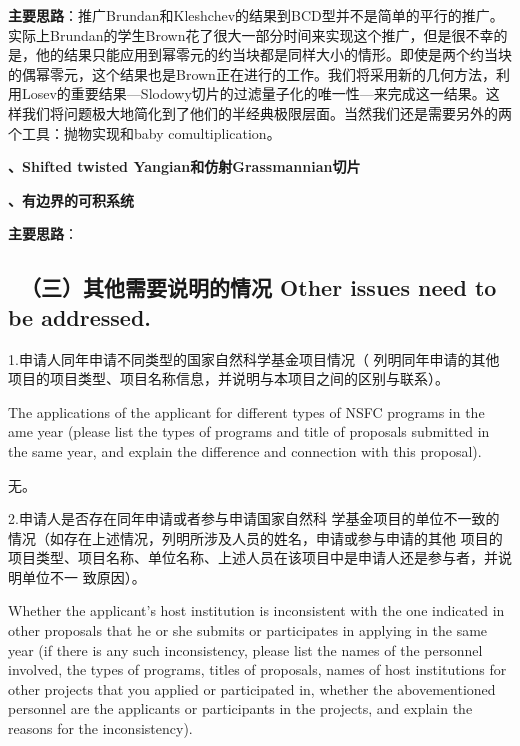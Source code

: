 \documentclass[12pt,UTF8,AutoFakeBold=4,a4paper]{ctexart}
\begin{document}
\textbf{主要思路}：推广Brundan和Kleshchev的结果到BCD型并不是简单的平行的推广。实际上Brundan的学生Brown花了很大一部分时间来实现这个推广，但是很不幸的是，他的结果只能应用到幂零元的约当块都是同样大小的情形。即使是两个约当块的偶幂零元，这个结果也是Brown正在进行的工作。我们将采用新的几何方法，利用Losev的重要结果---Slodowy切片的过滤量子化的唯一性---来完成这一结果。这样我们将问题极大地简化到了他们的半经典极限层面。当然我们还是需要另外的两个工具：抛物实现和baby comultiplication。

\medskip

\textbf{、Shifted twisted Yangian和仿射Grassmannian切片}

\medskip

\textbf{、有边界的可积系统}

\textbf{主要思路}：


{\color{MsBlue} \subsection{\sihao \kaishu \quad \ \bfseries（三）其他需要说明的情况 
\xiaosihao {} Other issues need to be addressed.}}
%

{\sihao \color{MsBlue} \kaishu 1.申请人同年申请不同类型的国家自然科学基金项目情况（
列明同年申请的其他项目的项目类型、项目名称信息，并说明与本项目之间的区别与联系）。}

{\color{MsBlue} \xiaosihao {} 
The applications of the applicant for different types of NSFC programs in the 
ame year (please list the types of programs and title of proposals submitted 
in the same year, and explain the difference and connection with this proposal).}

无。

{\sihao \color{MsBlue} \kaishu 2.申请人是否存在同年申请或者参与申请国家自然科
学基金项目的单位不一致的情况（如存在上述情况，列明所涉及人员的姓名，申请或参与申请的其他
项目的项目类型、项目名称、单位名称、上述人员在该项目中是申请人还是参与者，并说明单位不一
致原因）。}

{\color{MsBlue} \xiaosihao {} 
Whether the applicant's host institution is inconsistent with the one indicated 
in other proposals that he or she submits or participates in applying in the 
same year (if there is any such inconsistency, please list the names of the 
personnel involved, the types of programs, titles of proposals, names of host 
institutions for other projects that you applied or participated in, whether 
the abovementioned personnel are the applicants or participants in the projects, 
and explain the reasons for the inconsistency).}
\end{document}
